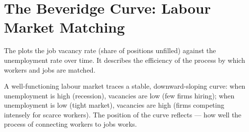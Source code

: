 \section{The Beveridge Curve: Labour Market Matching}
\label{sec:beveridge_curve}

The  plots the job vacancy rate (share of positions
unfilled) against the unemployment rate over time. It describes the
efficiency of the process by which workers and jobs are matched.

A well-functioning labour market traces a stable, downward-sloping curve:
when unemployment is high (recession), vacancies are low (few firms
hiring); when unemployment is low (tight market), vacancies are high
(firms competing intensely for scarce workers). The position of the curve
reflects  --- how well the process of connecting
workers to jobs works.

